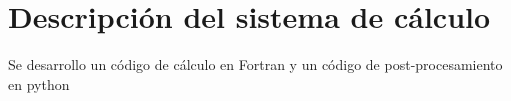 \section{Descripci\'on del sistema de c\'alculo}


Se desarrollo un c\'odigo de c\'alculo en Fortran y un c\'odigo de
post-procesamiento en python
